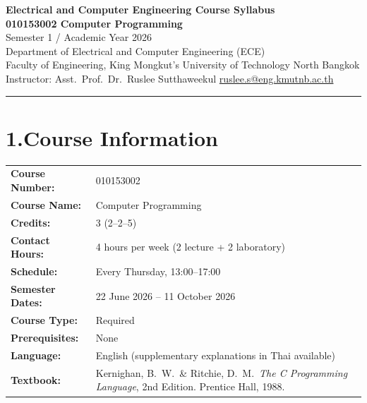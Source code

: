 \documentclass[11pt,a4paper]{article}
\newcommand{\fieldlabel}[1]{\textbf{#1:}}
\begin{document}
\begin{center}
  {\Large\bfseries\color{kmutnbBlue}
    Electrical and Computer Engineering Course Syllabus}\\[4pt]
  {\large\bfseries 010153002 \quad Computer Programming}\\[2pt]
  {\normalsize Semester 1 / Academic Year 2026}\\[2pt]
  {\small Department of Electrical and Computer Engineering (ECE)}\\
  {\small Faculty of Engineering,
    King Mongkut's University of Technology North Bangkok}\\[4pt]
  {\small Instructor: Asst.\ Prof.\ Dr.\ Ruslee Sutthaweekul
    \quad\textbar\quad
    \href{mailto:ruslee.s@eng.kmutnb.ac.th}{ruslee.s@eng.kmutnb.ac.th}}
\end{center}

\noindent\rule{\linewidth}{0.4pt}\medskip

\section*{1.\quad Course Information}
\begin{tabular}{@{}p{4.4cm}p{10.8cm}@{}}
  \fieldlabel{Course Number}   & 010153002 \\[2pt]
  \fieldlabel{Course Name}     & Computer Programming \\[2pt]
  \fieldlabel{Credits}         & 3 (2--2--5) \\[2pt]
  \fieldlabel{Contact Hours}   & 4 hours per week (2 lecture + 2 laboratory) \\[2pt]
  \fieldlabel{Schedule}        & Every Thursday, 13:00--17:00 \\[2pt]
  \fieldlabel{Semester Dates}  & 22 June 2026 -- 11 October 2026 \\[2pt]
  \fieldlabel{Course Type}     & Required \\[2pt]
  \fieldlabel{Prerequisites}   & None \\[2pt]
  \fieldlabel{Language}        & English (supplementary explanations in Thai available) \\[2pt]
  \fieldlabel{Textbook}        & Kernighan, B.~W.\ \& Ritchie, D.~M.\
                                  \textit{The C Programming Language},
                                  2nd Edition. Prentice Hall, 1988. \\
\end{tabular}
\end{document}
